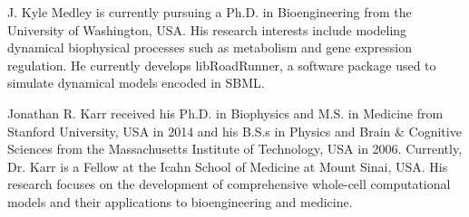 \documentclass[journal,transmag,twoside]{IEEEtran}
\begin{document}
\ifCLASSOPTIONcaptionsoff
  \newpage
\fi




\begin{IEEEbiography}{J. Kyle Medley}
is currently pursuing a Ph.D. in Bioengineering from the University of Washington, USA.
His research interests include modeling dynamical biophysical processes such as
metabolism and gene expression regulation.
He currently develops libRoadRunner, a software package used to simulate dynamical models encoded in SBML.
\end{IEEEbiography}

\begin{IEEEbiography}{Jonathan R. Karr}
received his Ph.D. in Biophysics and M.S. in Medicine from Stanford University, USA in 2014 and his B.S.s in Physics and Brain \& Cognitive Sciences from the Massachusetts Institute of Technology, USA in 2006. Currently, Dr. Karr is a Fellow at the Icahn School of Medicine at Mount Sinai, USA. His research focuses on the development of comprehensive whole-cell computational models and their applications to bioengineering and medicine.
\end{IEEEbiography}
\end{document}
